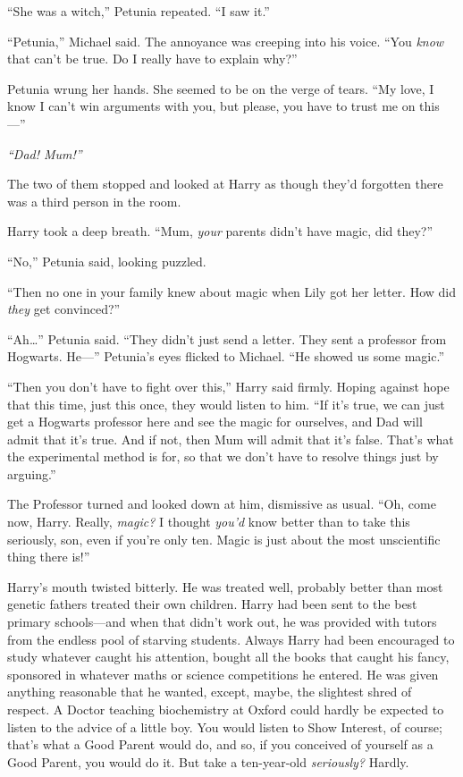 ``She was a witch,'' Petunia repeated. ``I saw it.''

``Petunia,'' Michael said. The annoyance was creeping into his voice.
``You \emph{know} that can't be true. Do I really have to explain why?''

Petunia wrung her hands. She seemed to be on the verge of tears. ``My
love, I know I can't win arguments with you, but please, you have to
trust me on this---''

\emph{``Dad! Mum!''}

The two of them stopped and looked at Harry as though they'd forgotten
there was a third person in the room.

Harry took a deep breath. ``Mum, \emph{your} parents didn't have magic,
did they?''

``No,'' Petunia said, looking puzzled.

``Then no one in your family knew about magic when Lily got her letter.
How did \emph{they} get convinced?''

``Ah\ldots{}'' Petunia said. ``They didn't just send a letter. They sent
a professor from Hogwarts. He---'' Petunia's eyes flicked to Michael.
``He showed us some magic.''

``Then you don't have to fight over this,'' Harry said firmly. Hoping
against hope that this time, just this once, they would listen to him.
``If it's true, we can just get a Hogwarts professor here and see the
magic for ourselves, and Dad will admit that it's true. And if not, then
Mum will admit that it's false. That's what the experimental method is
for, so that we don't have to resolve things just by arguing.''

The Professor turned and looked down at him, dismissive as usual. ``Oh,
come now, Harry. Really, \emph{magic?} I thought \emph{you'd} know
better than to take this seriously, son, even if you're only ten. Magic
is just about the most unscientific thing there is!''

Harry's mouth twisted bitterly. He was treated well, probably better
than most genetic fathers treated their own children. Harry had been
sent to the best primary schools---and when that didn't work out, he was
provided with tutors from the endless pool of starving students. Always
Harry had been encouraged to study whatever caught his attention, bought
all the books that caught his fancy, sponsored in whatever maths or
science competitions he entered. He was given anything reasonable that
he wanted, except, maybe, the slightest shred of respect. A Doctor
teaching biochemistry at Oxford could hardly be expected to listen to
the advice of a little boy. You would listen to Show Interest, of
course; that's what a Good Parent would do, and so, if you conceived of
yourself as a Good Parent, you would do it. But take a ten-year-old
\emph{seriously?} Hardly.

